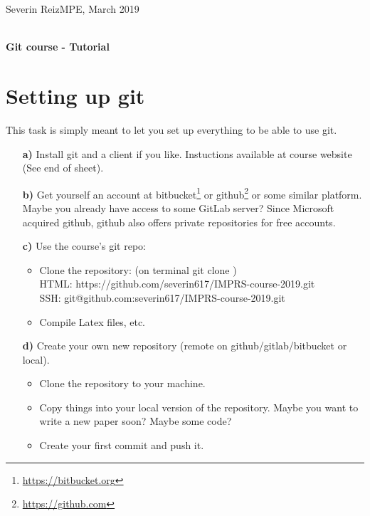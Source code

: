 \documentclass[11pt]{article}
\begin{document}
  {\normalsize  
Severin Reiz\hfill MPE, March 2019\\ 
    \mbox{}\\ [2ex] }

\thispagestyle{empty}
\begin{center}
    {\LARGE\sffamily\bfseries Git course - Tutorial}
\end{center}


\section*{Setting up git}
This task is simply meant to let you set up everything to be able to use git. 
\begin{itemize}
\item[\bf{a)}] Install git and a client if you like. Instuctions available at course website (See end of sheet).%
\item[\bf{b)}] Get yourself an account at bitbucket\footnote{\url{https://bitbucket.org}} or github\footnote{\url{https://github.com}} or some similar platform. Maybe you already have access to some GitLab server? Since Microsoft acquired github, github also offers private repositories for free accounts.
\item[\bf{c)}] Use the course's git repo:
\begin{itemize}
\item Clone the repository: (on terminal git clone )\\ 
HTML: https://github.com/severin617/IMPRS-course-2019.git \\
SSH: git@github.com:severin617/IMPRS-course-2019.git
\item Compile Latex files, etc.
\end{itemize}
\item[\bf{d)}] Create your own new repository (remote on github/gitlab/bitbucket or local).
\begin{itemize}
\item Clone the repository to your machine.
\item Copy things into your local version of the repository. Maybe you want to write a new paper soon? Maybe some code?
\item Create your first commit and push it.
\end{itemize}
\end{itemize}
\end{document}
